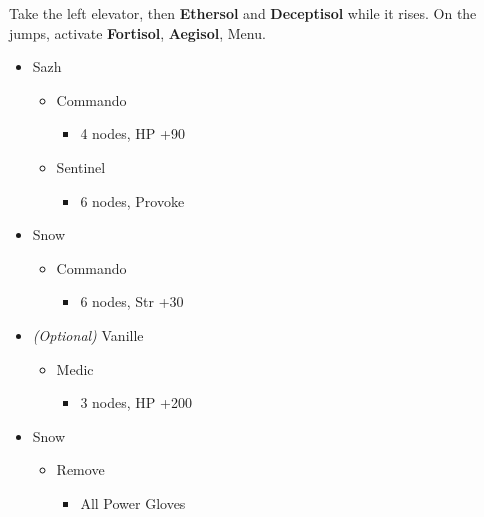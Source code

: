 	Take the left elevator, then \textbf{Ethersol} and \textbf{Deceptisol} while it rises. On the jumps, activate \textbf{Fortisol}, \textbf{Aegisol}, Menu.
	\begin{menu}
		\begin{itemize}
			\crystarium
			\begin{itemize}
				\item Sazh
				      \begin{itemize}
					      \item Commando
					            \begin{itemize}
						            \item 4 nodes, HP +90
					            \end{itemize}
					      \item Sentinel
					            \begin{itemize}
						            \item 6 nodes, Provoke
					            \end{itemize}
				      \end{itemize}
				\item Snow
				      \begin{itemize}
					      \item Commando
					            \begin{itemize}
						            \item 6 nodes, Str +30
					            \end{itemize}
				      \end{itemize}
				\item \textit{(Optional)} Vanille
				      \begin{itemize}
					      \item Medic
					            \begin{itemize}
						            \item 3 nodes, HP +200
					            \end{itemize}
				      \end{itemize}
			\end{itemize}
			\equip
			\begin{itemize}
				\item Snow
				      \begin{itemize}
					      \item Remove
					            \begin{itemize}
						            \item All Power Gloves
					            \end{itemize}

\end{itemize}
\end{itemize}
\end{itemize}
\end{menu}
